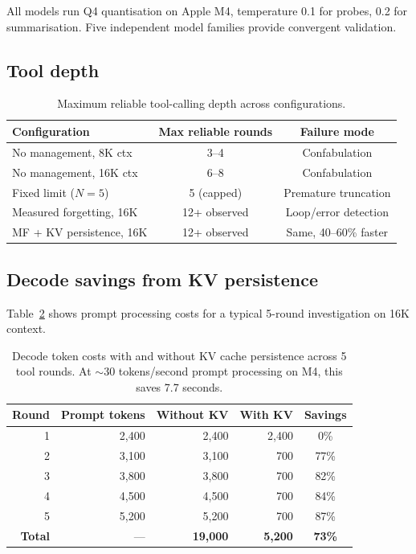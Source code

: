 \documentclass[11pt,a4paper]{article}
\begin{document}
\noindent All models run Q4 quantisation on Apple M4, temperature 0.1 for probes, 0.2 for summarisation. Five independent model families provide convergent validation.

\subsection{Tool depth}

\begin{table}[H]
\centering
\begin{tabular}{@{}lcc@{}}
\toprule
\textbf{Configuration} & \textbf{Max reliable rounds} & \textbf{Failure mode} \\
\midrule
No management, 8K ctx & 3--4 & Confabulation \\
No management, 16K ctx & 6--8 & Confabulation \\
Fixed limit ($N=5$) & 5 (capped) & Premature truncation \\
Measured forgetting, 16K & 12+ observed & Loop/error detection \\
MF + KV persistence, 16K & 12+ observed & Same, 40--60\% faster \\
\bottomrule
\end{tabular}
\caption{Maximum reliable tool-calling depth across configurations.}
\label{tab:depth}
\end{table}

\subsection{Decode savings from KV persistence}

Table~\ref{tab:kv} shows prompt processing costs for a typical 5-round investigation on 16K context.

\begin{table}[H]
\centering
\begin{tabular}{@{}rrrrc@{}}
\toprule
\textbf{Round} & \textbf{Prompt tokens} & \textbf{Without KV} & \textbf{With KV} & \textbf{Savings} \\
\midrule
1 & 2{,}400 & 2{,}400 & 2{,}400 & 0\% \\
2 & 3{,}100 & 3{,}100 & 700 & 77\% \\
3 & 3{,}800 & 3{,}800 & 700 & 82\% \\
4 & 4{,}500 & 4{,}500 & 700 & 84\% \\
5 & 5{,}200 & 5{,}200 & 700 & 87\% \\
\midrule
\textbf{Total} & --- & \textbf{19{,}000} & \textbf{5{,}200} & \textbf{73\%} \\
\bottomrule
\end{tabular}
\caption{Decode token costs with and without KV cache persistence across 5 tool rounds. At $\sim$30 tokens/second prompt processing on M4, this saves 7.7 seconds.}
\label{tab:kv}
\end{table}
\end{document}
